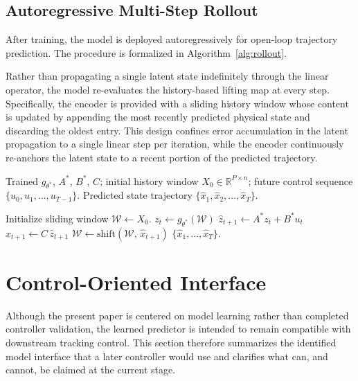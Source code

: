 \documentclass[journal]{IEEEtran}
\begin{document}
\subsection{Autoregressive Multi-Step Rollout}
\label{sec:rollout}

After training, the model is deployed autoregressively for open-loop trajectory prediction. The procedure is formalized in Algorithm~\ref{alg:rollout}.

Rather than propagating a single latent state indefinitely through the linear operator, the model re-evaluates the history-based lifting map at every step. Specifically, the encoder is provided with a sliding history window whose content is updated by appending the most recently predicted physical state and discarding the oldest entry. This design confines error accumulation in the latent propagation to a single linear step per iteration, while the encoder continuously re-anchors the latent state to a recent portion of the predicted trajectory.

\begin{algorithm}[!t]
\caption{Autoregressive Multi-Step Rollout}
\label{alg:rollout}
\begin{algorithmic}[1]
\REQUIRE Trained $g_{\theta^{*}}$, $A^{*}$, $B^{*}$, $C$;
         initial history window $X_0 \in \mathbb{R}^{P \times n}$;
         future control sequence $\{u_0, u_1, \ldots, u_{T-1}\}$.
\ENSURE  Predicted state trajectory $\{\hat{x}_1,\hat{x}_2,\ldots,\hat{x}_T\}$.

\STATE Initialize sliding window $\mathcal{W} \leftarrow X_0$.
    \STATE $z_t \leftarrow g_{\theta^{*}}(\mathcal{W})$
    \STATE $\hat{z}_{t+1} \leftarrow A^{*} z_t + B^{*} u_t$
    \STATE $\hat{x}_{t+1} \leftarrow C\,\hat{z}_{t+1}$
    \STATE $\mathcal{W} \leftarrow \mathrm{shift}(\mathcal{W},\,\hat{x}_{t+1})$
\ENDFOR
\RETURN $\{\hat{x}_1,\ldots,\hat{x}_T\}$.
\end{algorithmic}
\end{algorithm}

\section{Control-Oriented Interface}
\label{sec:control}

Although the present paper is centered on model learning rather than completed controller validation, the learned predictor is intended to remain compatible with downstream tracking control. This section therefore summarizes the identified model interface that a later controller would use and clarifies what can, and cannot, be claimed at the current stage.
\end{document}
